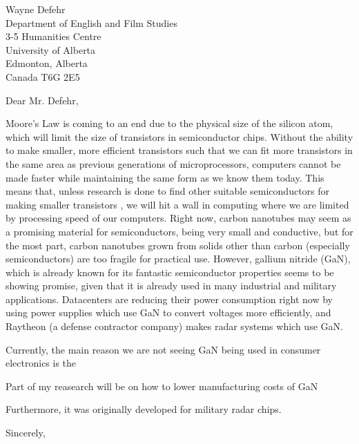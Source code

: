 \documentclass[letterpaper]{letter}
\begin{document}
\begin{letter}
{
Wayne Defehr\\
Department of English and Film Studies\\
3-5 Humanities Centre\\
University of Alberta\\
Edmonton, Alberta\\
Canada T6G 2E5\\
}

\opening{Dear Mr. Defehr,}
\doublespacing

Moore's Law is coming to an end due to the
physical size of the silicon atom, which will limit the size of transistors in semiconductor chips.
Without the ability to make smaller, more %
efficient transistors such that we can fit more transistors in the same area as previous generations
of microprocessors, computers cannot be made faster while maintaining the same form as we know them today.
This means that, unless research is done to find other suitable semiconductors for making smaller transistors
, we will hit a wall in computing where we are limited by processing speed of our computers.
Right now, carbon nanotubes may seem as a promising material for semiconductors, being very small and conductive,
but for the most part, carbon nanotubes grown from solids other than carbon (especially semiconductors)
are too fragile for practical use. However, gallium nitride (GaN), which is already known for its
fantastic semiconductor properties seems to be showing promise, given that it is already used in many
industrial and military applications. Datacenters are reducing their
power consumption right now by using power supplies which use GaN to convert voltages more efficiently, and
Raytheon (a defense contractor company) makes radar systems which use GaN.


Currently, the main reason we are not seeing GaN being used in consumer electronics is the




Part of my reasearch will be on how to lower manufacturing costs of GaN



Furthermore, it was originally developed for military radar chips.

\lipsum[3]
\closing{Sincerely,}

\end{letter}
\end{document}
